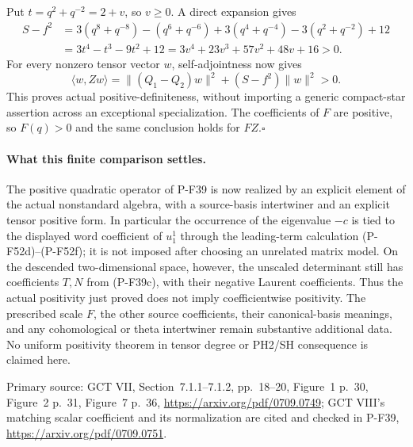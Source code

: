 Put $t=q^2+q^{-2}=2+v$, so $v\ge0$. A direct expansion gives
\[
 \begin{split}
 S-f^2
 &=3(q^8+q^{-8})-(q^6+q^{-6})
       +3(q^4+q^{-4})-3(q^2+q^{-2})+12\\
 &=3t^4-t^3-9t^2+12
   =3v^4+23v^3+57v^2+48v+16>0.
 \end{split}                                                    \tag{P-F52l}
\]
For every nonzero tensor vector $w$, self-adjointness now gives
\[
 \langle w,Zw\rangle
   =\|(Q_1-Q_2)w\|^2+(S-f^2)\|w\|^2>0.
\]
This proves actual positive-definiteness, without importing a
generic compact-star assertion across an exceptional specialization.
The coefficients of $F$ are positive, so $F(q)>0$ and the same
conclusion holds for $FZ$.\hfill$\square$

\paragraph{What this finite comparison settles.}
The positive quadratic operator of P-F39 is now realized by an
explicit element of the actual nonstandard algebra, with a
source-basis intertwiner and an explicit tensor positive form.
In particular the occurrence of the eigenvalue $-c$ is tied to
the displayed word coefficient of $u_1^1$ through the leading-term
calculation (P-F52d)--(P-F52f); it is not imposed after choosing an
unrelated matrix model. On the descended two-dimensional space,
however, the unscaled determinant still has coefficients $T,N$
from (P-F39c), with their negative Laurent coefficients. Thus the
actual positivity just proved does not imply coefficientwise
positivity. The prescribed scale $F$, the other source coefficients,
their canonical-basis meanings, and any cohomological or theta
intertwiner remain substantive additional data. No uniform positivity
theorem in tensor degree or PH2/SH consequence is claimed here.

Primary source: GCT VII, Section~7.1.1--7.1.2, pp.~18--20,
Figure~1 p.~30, Figure~2 p.~31, Figure~7 p.~36,
\url{https://arxiv.org/pdf/0709.0749}; GCT VIII's matching scalar
coefficient and its normalization are cited and checked in P-F39,
\url{https://arxiv.org/pdf/0709.0751}.

